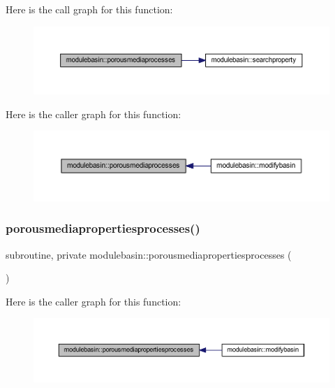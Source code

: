 Here is the call graph for this function\+:\nopagebreak
\begin{figure}[H]
\begin{center}
\leavevmode
\includegraphics[width=350pt]{namespacemodulebasin_aea9e156b76b5f88b91a7c975b33694ac_cgraph}
\end{center}
\end{figure}
Here is the caller graph for this function\+:\nopagebreak
\begin{figure}[H]
\begin{center}
\leavevmode
\includegraphics[width=350pt]{namespacemodulebasin_aea9e156b76b5f88b91a7c975b33694ac_icgraph}
\end{center}
\end{figure}
\mbox{\label{namespacemodulebasin_abe3651d838039c895cf2f2192597ff85}} 
\subsubsection{\texorpdfstring{porousmediapropertiesprocesses()}{porousmediapropertiesprocesses()}}
{\footnotesize\ttfamily subroutine, private modulebasin\+::porousmediapropertiesprocesses (\begin{DoxyParamCaption}{ }\end{DoxyParamCaption})\hspace{0.3cm}{\ttfamily [private]}}

Here is the caller graph for this function\+:\nopagebreak
\begin{figure}[H]
\begin{center}
\leavevmode
\includegraphics[width=350pt]{namespacemodulebasin_abe3651d838039c895cf2f2192597ff85_icgraph}
\end{center}
\end{figure}
\mbox{\label{namespacemodulebasin_af9f507847046c6d52d84d57c39911669}} 
